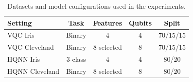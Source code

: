 \begin{table}[!t]
\centering
\caption{Datasets and model configurations used in the experiments.}
\label{tab:experimental-setup}
\begin{tabular}{lcccc}
\toprule
Setting & Task & Features & Qubits & Split \\
\midrule
VQC Iris & Binary & 4 & 4 & 70/15/15 \\
VQC Cleveland & Binary & 8 selected & 8 & 70/15/15 \\
HQNN Iris & 3-class & 4 & 4 & 80/20 \\
HQNN Cleveland & Binary & 8 selected & 8 & 80/20 \\
\bottomrule
\end{tabular}
\end{table}
